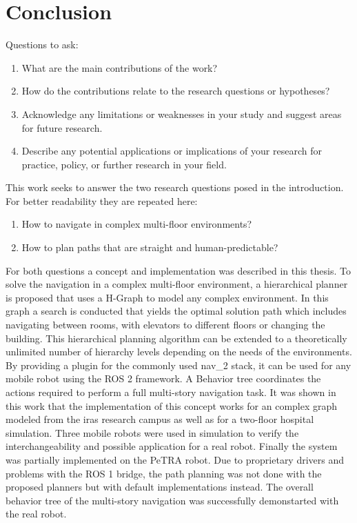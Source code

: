 \chapter{Conclusion}
\label{sec:conclusion}
Questions to ask:
\begin{enumerate}
    \item What are the main contributions of the work? 
    \item How do the contributions relate to the research questions or hypotheses? 
    \item Acknowledge any limitations or weaknesses in your study and suggest areas for future research. 
    \item Describe any potential applications or implications of your research for practice, policy, or further research in your field. 
\end{enumerate}


This work seeks to answer the two research questions posed in the introduction. For better readability they are repeated here:

\begin{enumerate}
    \item How to navigate in complex multi-floor environments?
    \item How to plan paths that are straight and human-predictable?
\end{enumerate}

For both questions a concept and implementation was described in this thesis. To solve the navigation in a complex multi-floor environment, a hierarchical planner is proposed that uses a H-Graph to model any complex environment. In this graph a search is conducted that yields the optimal solution path which includes navigating between rooms, with elevators to different floors or changing the building. This hierarchical planning algorithm can be extended to a theoretically unlimited number of hierarchy levels depending on the needs of the environments. By providing a plugin for the commonly used \gls{nav_2} stack, it can be used for any mobile robot using the ROS 2 framework. A Behavior tree coordinates the actions required to perform a full multi-story navigation task. It was shown in this work that the implementation of this concept works for an complex graph modeled from the \gls{iras} research campus as well as for a two-floor hospital simulation. Three mobile robots were used in simulation to verify the interchangeability and possible application for a real robot. Finally the system was partially implemented on the PeTRA robot. Due to proprietary drivers and problems with the ROS 1 bridge, the path planning was not done with the proposed planners but with default implementations instead. The overall behavior tree of the multi-story navigation was successfully demonstarted with the real robot.


